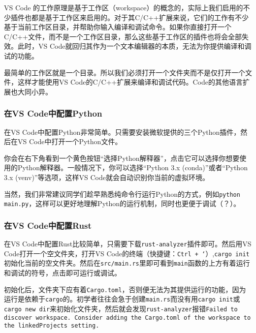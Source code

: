 \begin{tip}
  VS Code 的工作原理是基于工作区（workspace）的概念的，实际上我们启用的不少插件也都是基于工作区来启用的。对于其C/C++扩展来说，它们的工作有不少基于当前工作区目录，并帮助你输入编译和调试命令。如果你直接打开一个C/C++文件，而不是一个工作区目录，那么这些基于工作区的插件也将会全部失效。此时，VS Code就回归其作为一个文本编辑器的本质，无法为你提供编译和调试的功能。

  最简单的工作区就是一个目录。所以我们必须打开一个文件夹而不是仅打开一个文件，这样才能使用VS Code的C/C++扩展来编译和调试代码。Code的其他语言扩展也大同小异。
\end{tip}

\subsubsection{在VS Code中配置Python}

在VS Code中配置Python非常简单。只需要安装微软提供的三个Python插件，然后在VS Code中打开一个Python文件。

你会在右下角看到一个黄色按钮“选择Python解释器”，点击它可以选择你想要使用的Python解释器。一般情况下，你可以选择“Python 3.x (conda)”或者“Python 3.x (venv)”等选项，这样VS Code就会自动识别你当前的虚拟环境。

当然，我们非常建议同学们趁早熟悉纯命令行运行Python的方式，例如\texttt{python main.py}，这样可以更好地理解Python的运行机制，同时也更便于调试（？）。

\subsubsection{在VS Code中配置Rust}

在VS Code中配置Rust比较简单，只需要下载\texttt{rust-analyzer}插件即可。然后用VS Code打开一个空文件夹，打开VS Code的终端（快捷键：\texttt{Ctrl + `}）,\texttt{cargo init} 初始化当前的空文件夹。然后在\texttt{src/main.rs}里即可看到\texttt{main}函数的上方有着运行和调试的符号，点击即可运行或调试。

\begin{caution}
  初始化后，文件夹下应有着\texttt{Cargo.toml}，否则便无法为其提供运行的功能，因为运行是依赖于\texttt{cargo}的。初学者往往会急于创建\texttt{main.rs}而没有用\texttt{cargo init}或\texttt{cargo new dir}来初始化文件夹，然后就会发现\texttt{rust-analyzer}报错\texttt{Failed to discover workspace. Consider adding the Cargo.toml of the workspace to the linkedProjects setting.}
\end{caution}

